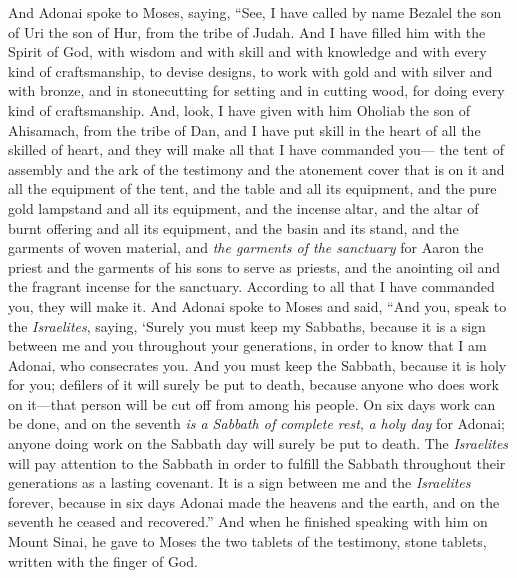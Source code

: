 \begin{biblechapter} %
 And Adonai spoke to Moses, saying,
\verse “See, I have called by name Bezalel the son of Uri the son of Hur, from the tribe of Judah.
\verse And I have filled him with the Spirit of God, with wisdom and with skill and with knowledge and with every kind of craftsmanship,
\verse to devise designs, to work with gold and with silver and with bronze,
\verse and in stonecutting for setting and in cutting wood, for doing every kind of craftsmanship.
\verse And, look, I have given with him Oholiab the son of Ahisamach, from the tribe of Dan, and I have put skill in the heart of all the skilled of heart, and they will make all that I have commanded you—
\verse the tent of assembly and the ark of the testimony and the atonement cover that is on it and all the equipment of the tent,
\verse and the table and all its equipment, and the pure gold lampstand and all its equipment, and the incense altar,
\verse and the altar of burnt offering and all its equipment, and the basin and its stand,
\verse and the garments of woven material, and \textit{the garments of the sanctuary} for Aaron the priest and the garments of his sons to serve as priests,
\verse and the anointing oil and the fragrant incense for the sanctuary. According to all that I have commanded you, they will make it.
 And Adonai spoke to Moses and said,
\verse “And you, speak to the \textit{Israelites}, saying, ‘Surely you must keep my Sabbaths, because it is a sign between me and you throughout your generations, in order to know that I am Adonai, who consecrates you.
\verse And you must keep the Sabbath, because it is holy for you; defilers of it will surely be put to death, because anyone who does work on it—that person will be cut off from among his people.
\verse On six days work can be done, and on the seventh \textit{is a Sabbath of complete rest}, \textit{a holy day} for Adonai; anyone doing work on the Sabbath day will surely be put to death.
\verse The \textit{Israelites} will pay attention to the Sabbath in order to fulfill the Sabbath throughout their generations as a lasting covenant.
\verse It is a sign between me and the \textit{Israelites} forever, because in six days Adonai made the heavens and the earth, and on the seventh he ceased and recovered.”
\verse And when he finished speaking with him on Mount Sinai, he gave to Moses the two tablets of the testimony, stone tablets, written with the finger of God.
\end{biblechapter}

